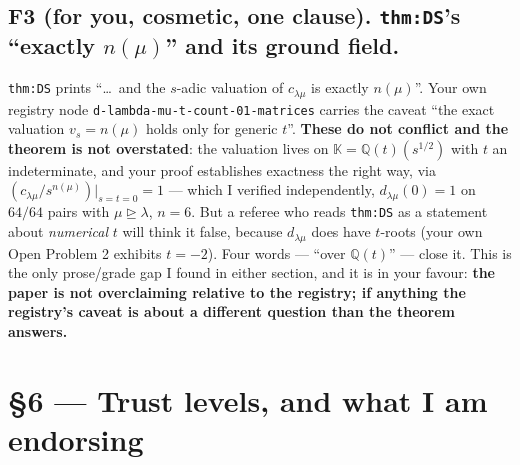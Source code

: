 \documentclass[11pt]{article}
\newcommand{\val}{v}
\begin{document}
\subsection*{F3 (for you, cosmetic, one clause). \texttt{thm:DS}'s ``exactly $n(\mu)$'' and its ground field.}

\texttt{thm:DS} prints ``\dots\ and the $s$-adic valuation of $c_{\lambda\mu}$ is exactly $n(\mu)$''.
Your own registry node \texttt{d-lambda-mu-t-count-01-matrices} carries the caveat ``the exact valuation
$\val_s=n(\mu)$ holds only for generic $t$''. \textbf{These do not conflict and the theorem is not
overstated}: the valuation lives on $\mathbb K=\mathbb Q(t)(s^{1/2})$ with $t$ an indeterminate, and
your proof establishes exactness the right way, via $(c_{\lambda\mu}/s^{n(\mu)})|_{s=t=0}=1$ --- which
I verified independently, $d_{\lambda\mu}(0)=1$ on $64/64$ pairs with $\mu\trianglerighteq\lambda$,
$n=6$. But a referee who reads \texttt{thm:DS} as a statement about \emph{numerical} $t$ will think it
false, because $d_{\lambda\mu}$ does have $t$-roots (your own Open Problem 2 exhibits $t=-2$). Four
words --- ``over $\mathbb Q(t)$'' --- close it. This is the only prose/grade gap I found in either
section, and it is in your favour: \textbf{the paper is not overclaiming relative to the registry;
if anything the registry's caveat is about a different question than the theorem answers.}

\section{\S6 --- Trust levels, and what I am endorsing}
\end{document}
